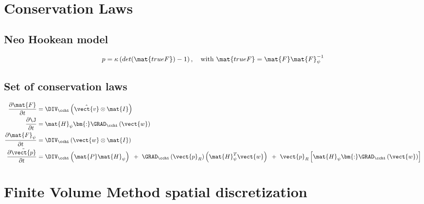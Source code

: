 \newpage
\section{Conservation Laws}
\subsection{Neo Hookean model}
\begin{equation}
	p = \kappa \left( det(\mat{trueF}) - 1 \right), \quad \textrm{with } \mat{trueF} = \mat{F} \mat{F}_{\psi}^{-1}
\end{equation}
\subsection{Set of conservation laws}
\begin{subequations}
\begin{align}
	\frac{\partial \mat{F}}{\partial t} &= \DIV_{\cchi}\left( \hat{\vect{v}} \otimes \mat{I} \right) \\ 
	\frac{\partial \J}{\partial t} &= \mat{H}_{\psi} \bm{:} \GRAD_{\cchi}\left( \vect{w} \right) \\
	\frac{\partial \mat{F}_{\psi}}{\partial t} &= \DIV_{\cchi}\left( \vect{w} \otimes \mat{I} \right) \\
	\frac{\partial \tilde{\vect{p}}}{\partial t} &= \DIV_{\cchi}\left( \mat{P}\mat{H}_{\psi}\right) {~}+{~} \GRAD_{\cchi} \left(  \vect{p}_R \right) \left( \mat{H}_{\psi}^{T}\vect{w} \right)  {~}+{~} \vect{p}_R \left[\mat{H}_{\psi} \bm{:} \GRAD_{\cchi}\left( \vect{w} \right) \right]
\end{align}
\end{subequations}


\section{Finite Volume Method spatial discretization}
%
